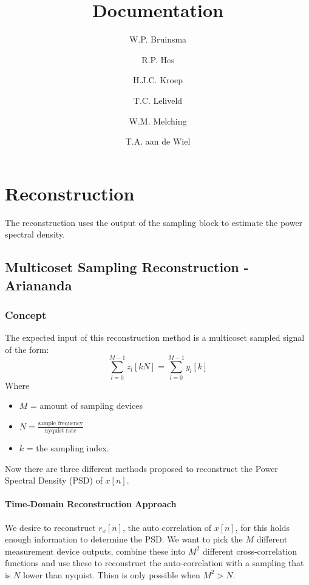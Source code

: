 \documentclass[report, oneside, a4paper, openany]{memoir}
\title{Documentation}
\author{W.P. Bruinsma \and R.P. Hes \and H.J.C. Kroep \and T.C. Leliveld \and W.M. Melching \and T.A. aan de Wiel}
\begin{document}
\chapter{Reconstruction}
The reconstruction uses the output of the sampling block to estimate the power spectral density.

\section{Multicoset Sampling Reconstruction -Ariananda}
\subsection{Concept}
The expected input of this reconstruction method is a multicoset sampled signal of the form:
$$
\sum_{l=0}^{M-1}z_l[kN] = \sum_{l=0}^{M-1}y_l[k]
$$
Where
\begin{itemize}
\item $M$  = amount of sampling devices
\item $N = \frac{\text{sample frequency}}{\text{nyquist rate}}$
\item $k$ = the sampling index.
\end{itemize}

Now there are three different methods proposed to reconstruct the Power Spectral Density (PSD) of $x[n]$.

\subsubsection{Time-Domain Reconstruction Approach}
We desire to reconstruct $r_x[n]$, the auto correlation of $x[n]$, for this holds enough information to determine the PSD.
We want to pick the $M$ different measurement device outputs, combine these into $M^2$ different cross-correlation functions and use these to reconstruct the auto-correlation with a sampling that is $N$ lower than nyquist. Thisn is only possible when $M^2>N$.
\end{document}
